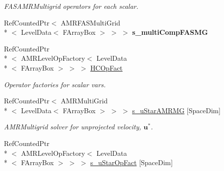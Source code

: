 \begin{DoxyCompactItemize}
\begin{DoxyCompactList}\small\item\em F\-A\-S\-A\-M\-R\-Multigrid operators for each scalar. \end{DoxyCompactList}\item 
\hypertarget{class_a_m_r_level_mushy_layer_aa4c450c7dd79bb47d3caa9aafbeda62a}{Ref\-Counted\-Ptr$<$ A\-M\-R\-F\-A\-S\-Multi\-Grid\\*
$<$ Level\-Data$<$ F\-Array\-Box $>$ $>$ $>$ {\bfseries s\-\_\-multi\-Comp\-F\-A\-S\-M\-G}}\label{class_a_m_r_level_mushy_layer_aa4c450c7dd79bb47d3caa9aafbeda62a}

\item 
\hypertarget{class_a_m_r_level_mushy_layer_a66838ab2619985c016ecd218b6e2bc20}{Ref\-Counted\-Ptr\\*
$<$ A\-M\-R\-Level\-Op\-Factory$<$ Level\-Data\\*
$<$ F\-Array\-Box $>$ $>$ $>$ \hyperlink{class_a_m_r_level_mushy_layer_a66838ab2619985c016ecd218b6e2bc20}{H\-C\-Op\-Fact}}\label{class_a_m_r_level_mushy_layer_a66838ab2619985c016ecd218b6e2bc20}

\begin{DoxyCompactList}\small\item\em Operator factories for scalar vars. \end{DoxyCompactList}\item 
\hypertarget{class_a_m_r_level_mushy_layer_abbb061fba0c367430c23fc97dc453db5}{Ref\-Counted\-Ptr$<$ A\-M\-R\-Multi\-Grid\\*
$<$ Level\-Data$<$ F\-Array\-Box $>$ $>$ $>$ \hyperlink{class_a_m_r_level_mushy_layer_abbb061fba0c367430c23fc97dc453db5}{s\-\_\-u\-Star\-A\-M\-R\-M\-G} \mbox{[}Space\-Dim\mbox{]}}\label{class_a_m_r_level_mushy_layer_abbb061fba0c367430c23fc97dc453db5}

\begin{DoxyCompactList}\small\item\em A\-M\-R\-Multigrid solver for unprojected velocity, $ \mathbf{u}^* $. \end{DoxyCompactList}\item 
\hypertarget{class_a_m_r_level_mushy_layer_abd0f7cb699d55a6f8cff657c24deedb7}{Ref\-Counted\-Ptr\\*
$<$ A\-M\-R\-Level\-Op\-Factory$<$ Level\-Data\\*
$<$ F\-Array\-Box $>$ $>$ $>$ \hyperlink{class_a_m_r_level_mushy_layer_abd0f7cb699d55a6f8cff657c24deedb7}{s\-\_\-u\-Star\-Op\-Fact} \mbox{[}Space\-Dim\mbox{]}}\label{class_a_m_r_level_mushy_layer_abd0f7cb699d55a6f8cff657c24deedb7}


\end{DoxyCompactItemize}
